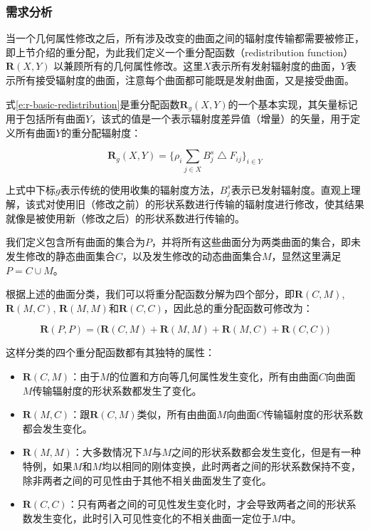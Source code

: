 \subsubsection{需求分析}
当一个几何属性修改之后，所有涉及改变的曲面之间的辐射度传输都需要被修正，即上节介绍的重分配，为此我们定义一个重分配函数（redistribution function） $\mathbf{R}(X,Y)$ 以兼顾所有的几何属性修改。这里$X$表示所有发射辐射度的曲面，$Y$表示所有接受辐射度的曲面，注意每个曲面都可能既是发射曲面，又是接受曲面。

式\ref{e:r-basic-redistribution}是重分配函数$\mathbf{R}_g(X,Y)$的一个基本实现，其矢量标记用于包括所有曲面$Y$，该式的值是一个表示辐射度差异值（增量）的矢量，用于定义所有曲面$Y$的重分配辐射度：

\begin{equation}\label{e:r-basic-redistribution}
	\mathbf{R}_g(X,Y)=\Biggr\{ \rho_i\sum_{j\in X}B^{s}_j \bigtriangleup F_{ij} \Biggr\}_{i\in Y}
\end{equation}

\noindent 上式中下标$g$表示传统的使用收集的辐射度方法，$B^{s}_j$表示已发射辐射度。直观上理解，该式对使用旧（修改之前）的形状系数进行传输的辐射度进行修改，使其结果就像是被使用新（修改之后）的形状系数进行传输的。

我们定义包含所有曲面的集合为$P$，并将所有这些曲面分为两类曲面的集合，即未发生修改的静态曲面集合$C$，以及发生修改的动态曲面集合$M$，显然这里满足$P=C\cup M$。

根据上述的曲面分类，我们可以将重分配函数分解为四个部分，即$\mathbf{R}(C,M)$, $\mathbf{R}(M, C)$, $\mathbf{R}(M, M)$和$\mathbf{R}(C, C)$，因此总的重分配函数可修改为：

\begin{equation}
	\mathbf{R}(P, P)=\bigg( \mathbf{R}(C,M)+\mathbf{R}(M,M)+\mathbf{R}(M,C)+\mathbf{R}(C,C) \bigg)
\end{equation}

\noindent 这样分类的四个重分配函数都有其独特的属性：

\begin{itemize}
	\item $\mathbf{R}(C,M)$：由于$M$的位置和方向等几何属性发生变化，所有由曲面$C$向曲面$M$传输辐射度的形状系数都发生了变化。
	\item $\mathbf{R}(M,C)$：跟$\mathbf{R}(C,M)$类似，所有由曲面$M$向曲面$C$传输辐射度的形状系数都会发生变化。 
	\item $\mathbf{R}(M,M)$：大多数情况下$M$与$M$之间的形状系数都会发生变化，但是有一种特例，如果$M$和$M$均以相同的刚体变换，此时两者之间的形状系数保持不变，除非两者之间的可见性由于其他不相关曲面发生了变化。
	\item $\mathbf{R}(C,C)$：只有两者之间的可见性发生变化时，才会导致两者之间的形状系数发生变化，此时引入可见性变化的不相关曲面一定位于$M$中。
\end{itemize}

